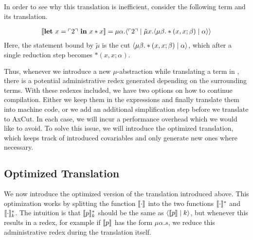 In order to see why this translation is inefficient, consider the following term and its translation.
\begin{example}
  \label{ex:translation_naive}
  \begin{align*}
    \llbracket \mathbf{let}\ x = \ulcorner 2 \urcorner\ \mathbf{in}\ x*x \rrbracket = \mu\alpha.\langle \ulcorner 2 \urcorner \mid \tilde\mu x.\langle \mu\beta.*(x,x;\beta) \mid \alpha \rangle \rangle
  \end{align*}
  Here, the statement bound by $\tilde\mu$ is the cut $\langle \mu\beta.*(x,x;\beta) \mid \alpha \rangle$, which after a single reduction step becomes $*(x,x;\alpha)$.
\end{example}
Thus, whenever we introduce a new $\mu$-abstraction while translating a term in \surfacelang{}, there is a potential administrative redex generated  depending on the surrounding terms.
With these redexes included, we have two options on how to continue compilation. 
Either we keep them in the expressions and finally translate them into machine code, or we add an additional simplification step before we translate \targetlang{} to AxCut.
In each case, we will incur a performance overhead which we would like to avoid. 
To solve this issue, we will introduce the optimized translation, which keeps track of introduced covariables and only generate new ones where necessary.


\subsection{Optimized Translation}
\label{subsec:translation:optimized}
We now introduce the optimized version of the translation introduced above.
This optimization works by splitting the function $\llbracket \cdot \rrbracket$ into the two functions $\llbracket \cdot \rrbracket_{}^{\ast}$ and $\llbracket \cdot \rrbracket_{k}^{\ast}$.
The intuition is that $\llbracket p \rrbracket_{k}^{\ast}$ should be the same as $\langle \llbracket p \rrbracket \mid k \rangle$, but whenever this results in a redex, for example if $\llbracket p \rrbracket$ has the form $\mu \alpha.s$, we reduce this administrative redex during the translation itself.

